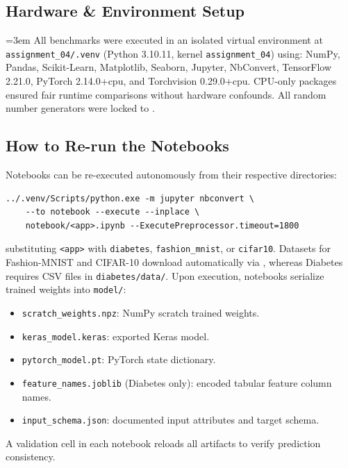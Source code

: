 \documentclass[11pt]{article}
\newcommand{\code}[1]{\texttt{\detokenize{#1}}}
\begin{document}
\subsection{Hardware \& Environment Setup}

\begingroup\sloppy\emergencystretch=3em
All benchmarks were executed in an isolated virtual environment at \texttt{assignment\_04/.venv} (Python 3.10.11, kernel \texttt{assignment\_04}) using: NumPy, Pandas, Scikit-Learn, Matplotlib, Seaborn, Jupyter, NbConvert, TensorFlow 2.21.0, PyTorch 2.14.0+cpu, and Torchvision 0.29.0+cpu. CPU-only packages ensured fair runtime comparisons without hardware confounds. All random number generators were locked to \code{RANDOM_SEED = 42}.
\par\endgroup

\subsection{How to Re-run the Notebooks}

Notebooks can be re-executed autonomously from their respective directories:
\begin{footnotesize}
\begin{verbatim}
../.venv/Scripts/python.exe -m jupyter nbconvert \
    --to notebook --execute --inplace \
    notebook/<app>.ipynb --ExecutePreprocessor.timeout=1800
\end{verbatim}
\end{footnotesize}
substituting \texttt{<app>} with \texttt{diabetes}, \texttt{fashion\_mnist}, or \texttt{cifar10}. Datasets for Fashion-MNIST and CIFAR-10 download automatically via \code{keras.datasets}, whereas Diabetes requires CSV files in \texttt{diabetes/data/}. Upon execution, notebooks serialize trained weights into \texttt{model/}:
\begin{itemize}[nosep]
  \item \texttt{scratch\_weights.npz}: NumPy scratch trained weights.
  \item \texttt{keras\_model.keras}: exported Keras model.
  \item \texttt{pytorch\_model.pt}: PyTorch state dictionary.
  \item \texttt{feature\_names.joblib} (Diabetes only): encoded tabular feature column names.
  \item \texttt{input\_schema.json}: documented input attributes and target schema.
\end{itemize}
A validation cell in each notebook reloads all artifacts to verify prediction consistency.
\end{document}
